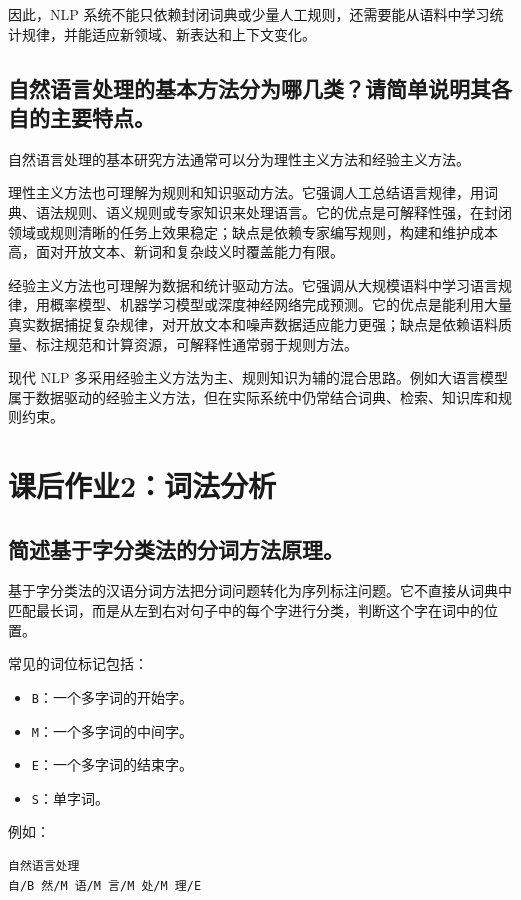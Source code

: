 因此，NLP 系统不能只依赖封闭词典或少量人工规则，还需要能从语料中学习统计规律，并能适应新领域、新表达和上下文变化。

\subsection{自然语言处理的基本方法分为哪几类？请简单说明其各自的主要特点。}

自然语言处理的基本研究方法通常可以分为理性主义方法和经验主义方法。

理性主义方法也可理解为规则和知识驱动方法。它强调人工总结语言规律，用词典、语法规则、语义规则或专家知识来处理语言。它的优点是可解释性强，在封闭领域或规则清晰的任务上效果稳定；缺点是依赖专家编写规则，构建和维护成本高，面对开放文本、新词和复杂歧义时覆盖能力有限。

经验主义方法也可理解为数据和统计驱动方法。它强调从大规模语料中学习语言规律，用概率模型、机器学习模型或深度神经网络完成预测。它的优点是能利用大量真实数据捕捉复杂规律，对开放文本和噪声数据适应能力更强；缺点是依赖语料质量、标注规范和计算资源，可解释性通常弱于规则方法。

现代 NLP 多采用经验主义方法为主、规则知识为辅的混合思路。例如大语言模型属于数据驱动的经验主义方法，但在实际系统中仍常结合词典、检索、知识库和规则约束。

\section{课后作业2：词法分析}

\subsection{简述基于字分类法的分词方法原理。}

基于字分类法的汉语分词方法把分词问题转化为序列标注问题。它不直接从词典中匹配最长词，而是从左到右对句子中的每个字进行分类，判断这个字在词中的位置。

常见的词位标记包括：
\begin{itemize}
  \item \texttt{B}：一个多字词的开始字。
  \item \texttt{M}：一个多字词的中间字。
  \item \texttt{E}：一个多字词的结束字。
  \item \texttt{S}：单字词。
\end{itemize}

例如：
\begin{verbatim}
自然语言处理
自/B 然/M 语/M 言/M 处/M 理/E
\end{verbatim}

